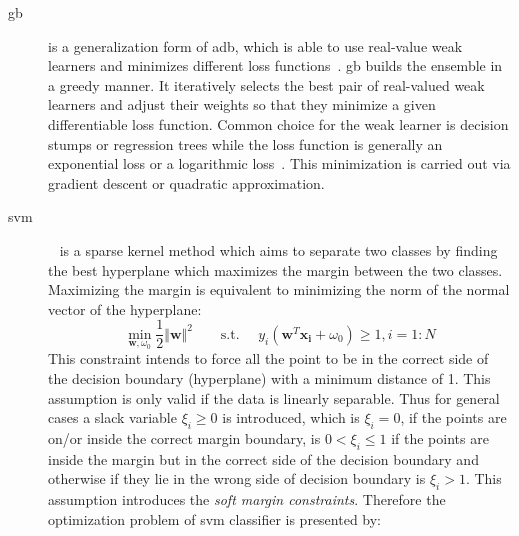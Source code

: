 \begin{description}
\item[\acl{gb}] is a generalization form of \ac{adb}, which is able to use real-value weak learners and minimizes different loss functions~\cite{zheng2007general}.
\ac{gb} builds the ensemble in a greedy manner. 
It iteratively selects the best pair of real-valued weak learners and adjust their weights so that they minimize a given differentiable loss function.
Common choice for the weak learner is decision stumps or regression trees while the loss function is generally an exponential loss or a logarithmic loss~\cite{becker2013supervised}. 
This minimization is carried out via gradient descent or quadratic approximation.\\

\item[\acl{svm}]~\cite{vapnik1963generalized} is a sparse kernel method which aims to separate two classes by finding the best hyperplane which maximizes the margin between the two classes. 
Maximizing the margin is equivalent to minimizing the norm of the normal vector of the hyperplane: 
\begin{equation}
\min\limits_{\mathbf{w}, \omega_{0}} \frac{1}{2} \Vert \mathbf{w}\Vert^{2} \qquad \text{s.t. } \quad  y_{i}(\mathbf{w}^{T}\mathbf{x_{i}} + \omega_{0}) \geq 1, i = 1: N
\label{eq:svmsm}
\end{equation}
\noindent This constraint intends to force all the point to be in the correct side of the decision boundary (hyperplane) with a minimum distance of 1. 
This assumption is only valid if the data is linearly separable. 
Thus for general cases a slack variable $\xi_{i} \geq 0 $ is introduced, which is $\xi_{i} = 0 $, if the points are on/or inside the correct margin boundary, is $0 < \xi_{i} \leq 1 $ if the points are inside the margin but in the correct side of the decision boundary and otherwise if they lie in the wrong side of decision boundary is $\xi_{i} > 1 $. 
This assumption introduces the \textit{soft margin constraints}.
Therefore the optimization problem of \ac{svm} classifier is presented by:


\end{description}
